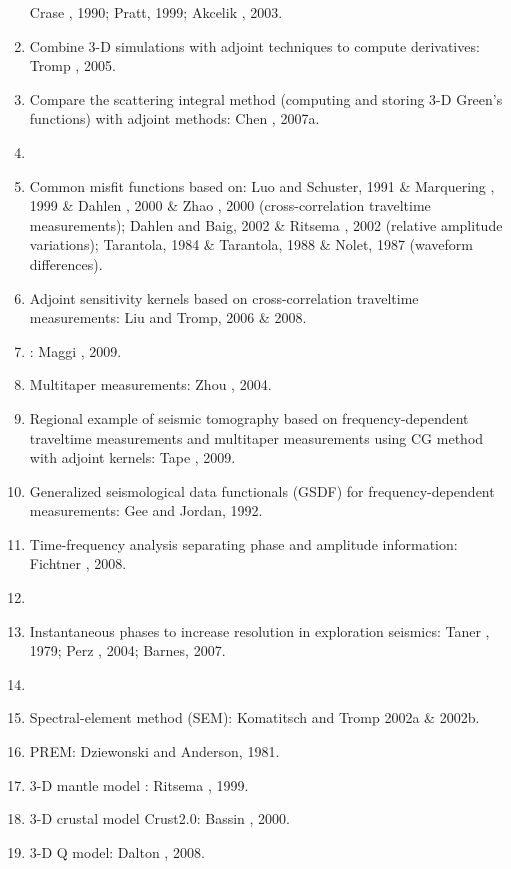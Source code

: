\begin{enumerate}[\hspace{10mm}*]
    Crase \etal, 1990; Pratt, 1999; Akcelik \etal, 2003.
  \item Combine 3-D simulations with adjoint techniques to compute \Frechet derivatives:
    Tromp \etal, 2005.
  \item Compare the scattering integral method (computing and storing 3-D Green's functions)
    with adjoint methods: Chen \etal, 2007a.
  \item \sline
  \item Common misfit functions based on: Luo and Schuster, 1991 \& Marquering \etal, 1999 \&
    Dahlen \etal, 2000 \& Zhao \etal, 2000 (cross-correlation traveltime measurements);
    Dahlen and Baig, 2002 \& Ritsema \etal, 2002 (relative amplitude variations);
    Tarantola, 1984 \& Tarantola, 1988 \& Nolet, 1987 (waveform differences).
  \item Adjoint sensitivity kernels based on cross-correlation traveltime measurements:
    Liu and Tromp, 2006 \& 2008.
  \item {}:
    Maggi \etal, 2009.
  \item Multitaper measurements: Zhou \etal, 2004.
  \item Regional example of seismic tomography based on frequency-dependent traveltime measurements
    and multitaper measurements using CG method with adjoint kernels: Tape \etal, 2009.
  \item Generalized seismological data functionals (GSDF) for frequency-dependent measurements:
    Gee and Jordan, 1992.
  \item Time-frequency analysis separating phase and amplitude information: Fichtner \etal, 2008.
  \item \sline
  \item Instantaneous phases to increase resolution in exploration seismics:
    Taner \etal, 1979; Perz \etal, 2004; Barnes, 2007.
  \item \sline
  \item Spectral-element method (SEM): Komatitsch and Tromp 2002a \& 2002b.
  \item PREM: Dziewonski and Anderson, 1981.
  \item 3-D mantle model :
    Ritsema \etal, 1999.
  \item 3-D crustal model Crust2.0: Bassin \etal, 2000.
  \item 3-D Q model: Dalton \etal, 2008.
\end{enumerate}

